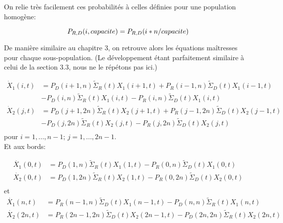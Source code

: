 On relie très facilement ces  probabilités à celles définies pour une population homogène:

\begin{equation}
P_{R,D}(i,capacite)=P_{R,D}(i*n/capacite)\\
\label{loi_capacite}
\end{equation}



De manière similaire au chapitre 3, on retrouve alors les équations maîtresses pour chaque sous-population. (Le développement étant parfaitement similaire à celui de la section 3.3, nous ne le répétons pas ici.)



\begin{equation}
\begin{aligned}
\dot{X}_1(i,t) &= P_D(i+1,n) \tilde{\Sigma}_R(t) X_1(i+1,t) + P_R(i-1,n) \tilde{\Sigma}_D(t) X_1(i-1,t)\\
					&-P_D(i,n) \tilde{\Sigma}_R(t) X_1(i,t) -P_R(i,n) \tilde{\Sigma}_D(t) X_1(i,t)\\
\dot{X}_2(j,t) &= P_D(j+1,2n) \tilde{\Sigma}_R(t) X_2(j+1,t) + P_R(j-1,2n) \tilde{\Sigma}_D(t) X_2(j-1,t)\\
					&-P_D(j,2n) \tilde{\Sigma}_R(t) X_2(j,t) -P_R(j,2n) \tilde{\Sigma}_D(t) X_2(j,t)\\		
\label{maitressebis}
\end{aligned}
\end{equation}
pour $i = 1,...,n-1$; $j=1,...,2n-1$.\\

Et aux bords:

\begin{equation}
\begin{aligned}
\dot{X_1}(0,t)&= P_D(1,n) \tilde{\Sigma}_R(t) X_1(1,t) - P_R(0,n) \tilde{\Sigma}_D(t) X_1(0,t)\\
\dot{X_2}(0,t)&= P_D(1,2n) \tilde{\Sigma}_R(t) X_2(1,t) - P_R(0,2n) \tilde{\Sigma}_D(t) X_2(0,t)\\
\label{bord0bis}
\end{aligned}
\end{equation}
 et 
\begin{equation}
\begin{aligned}
\dot{X_1}(n,t)&= P_R(n-1,n) \tilde{\Sigma}_D(t) X_1(n-1,t)- P_D(n,n) \tilde{\Sigma}_R(t) X_1(n,t)\\
\dot{X_2}(2n,t)&= P_R(2n-1,2n) \tilde{\Sigma}_D(t) X_2(2n-1,t)- P_D(2n,2n) \tilde{\Sigma}_R(t) X_2(2n,t)\\
\label{bordNbis}
\end{aligned}
\end{equation}

